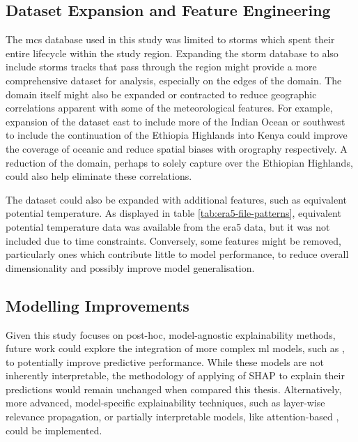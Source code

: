 \subsection{Dataset Expansion and Feature Engineering}

The \acrshort{mcs} database used in this study was limited to storms which spent their entire lifecycle within the study region. Expanding the storm database to also include storms tracks that pass through the region might provide a more comprehensive dataset for analysis, especially on the edges of the domain. The domain itself might also be expanded or contracted to reduce geographic correlations apparent with some of the meteorological features. For example, expansion of the dataset east to include more of the Indian Ocean or southwest to include the continuation of the Ethiopia Highlands into Kenya could improve the coverage of oceanic  and reduce spatial biases with orography respectively. A reduction of the domain, perhaps to solely capture  over the Ethiopian Highlands, could also help eliminate these correlations.

The dataset could also be expanded with additional features, such as equivalent potential temperature. As displayed in table \ref{tab:era5-file-patterns}, equivalent potential temperature data was available from the \acrshort{era5} data, but it was not included due to time constraints. Conversely, some features might be removed, particularly ones which contribute little to model performance, to reduce overall dimensionality and possibly improve model generalisation.

\subsection{Modelling Improvements}

Given this study focuses on post-hoc, model-agnostic explainability methods, future work could explore the integration of more complex \acrshort{ml} models, such as , to potentially improve predictive performance. While these models are not inherently interpretable, the methodology of applying of SHAP to explain their predictions would remain unchanged when compared this thesis. Alternatively, more advanced, model-specific explainability techniques, such as layer-wise relevance propagation, or partially interpretable models, like attention-based , could be implemented.